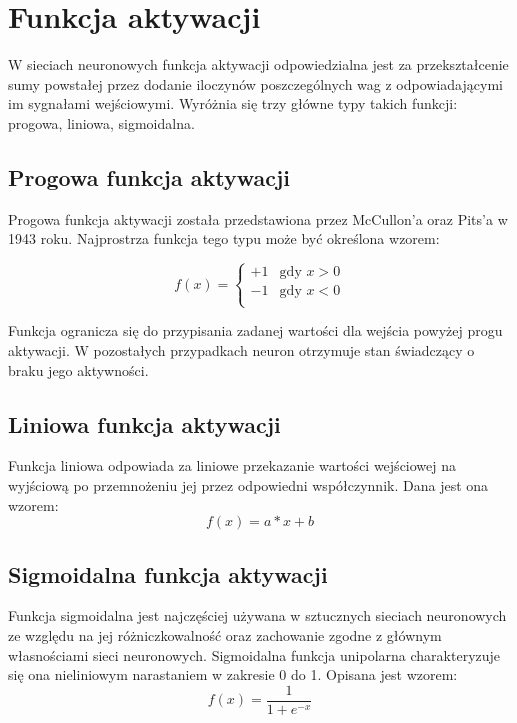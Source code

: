 \section{Funkcja aktywacji}
W sieciach neuronowych funkcja aktywacji odpowiedzialna jest za przekształcenie sumy powstałej przez dodanie iloczynów poszczególnych wag z odpowiadającymi im sygnałami wejściowymi. Wyróżnia się trzy główne typy takich funkcji: progowa, liniowa, sigmoidalna. 

\subsection{Progowa funkcja aktywacji}
Progowa funkcja aktywacji została przedstawiona przez McCullon'a oraz Pits'a w 1943 roku. Najprostrza funkcja tego typu może być określona wzorem:


$$ 
f(x) = \left\{ \begin{array}{ll}
+1 & \textrm{gdy $x>0$}\\
-1 & \textrm{gdy $x<0$}\\
\end{array} \right.
$$

Funkcja ogranicza się do przypisania zadanej wartości dla wejścia powyżej progu aktywacji. W pozostałych przypadkach neuron otrzymuje stan świadczący o braku jego aktywności.




\subsection{Liniowa funkcja aktywacji}
Funkcja liniowa odpowiada za liniowe przekazanie wartości wejściowej na wyjściową po przemnożeniu jej przez odpowiedni współczynnik. Dana jest ona wzorem:
$$ 
f(x) = a*x + b
$$


\subsection{Sigmoidalna funkcja aktywacji}
Funkcja sigmoidalna jest najczęściej używana w sztucznych sieciach neuronowych ze względu na jej różniczkowalność oraz zachowanie zgodne z głównym własnościami sieci neuronowych. Sigmoidalna funkcja unipolarna charakteryzuje się ona nieliniowym narastaniem w zakresie 0 do 1. Opisana jest wzorem:
$$ 
f(x) = \frac{1}{1 + e^{-x}}
$$


